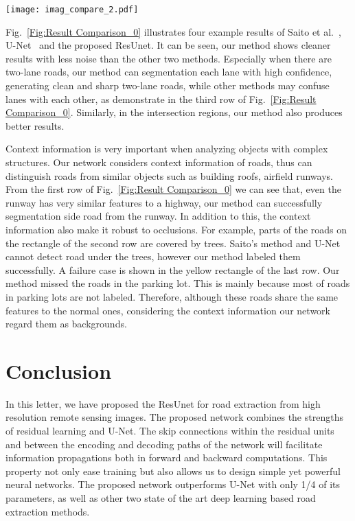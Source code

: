 \documentclass[journal]{IEEEtran}
\begin{document}
\begin{figure*}[ht]
\begin{center}
		\texttt{[image: imag\_compare\_2.pdf]}
	    \caption{Example results on the test set of Massachusetts roads dataset. (a) Input image; (b) Ground truth; (c) Saito et al.~\cite{Saito2016Multiple}; (d) U-Net~\cite{U-NET2015}; (e) The proposed ResUnet. Zoom in to see more details.}
	    \label{Fig:Result Comparison_0}
\end{center}
\vspace{-0.6cm}
\end{figure*}

Fig.~\ref{Fig:Result Comparison_0} illustrates four example results of Saito et al.~\cite{Saito2016Multiple}, U-Net~\cite{U-NET2015} and the proposed ResUnet. It can be seen, our method shows cleaner results with less noise than the other two methods. Especially when there are two-lane roads, our method can segmentation each lane with high confidence, generating clean and sharp two-lane roads, while other methods may confuse lanes with each other, as demonstrate in the third row of Fig.~\ref{Fig:Result Comparison_0}. Similarly, in the intersection regions, our method also produces better results.

Context information is very important when analyzing objects with complex structures. Our network considers context information of roads, thus can distinguish roads from similar objects such as building roofs, airfield runways. From the first row of Fig.~\ref{Fig:Result Comparison_0} we can see that, even the runway has very similar features to a highway, our method can successfully segmentation side road from the runway. In addition to this, the context information also make it robust to occlusions. For example, parts of the roads on the rectangle of the second row are covered by trees. Saito's method and U-Net cannot detect road under the trees, however our method labeled them successfully. A failure case is shown in the yellow rectangle of the last row. Our method missed the roads in the parking lot. This is mainly because most of roads in parking lots are not labeled. Therefore, although these roads share the same features to the normal ones, considering the context information our network regard them as backgrounds. 


\section{Conclusion}
\label{sec:conslusion}
In this letter, we have proposed the ResUnet for road extraction from high resolution remote sensing images. The proposed network combines the strengths of residual learning and U-Net. The skip connections within the residual units and between the encoding and decoding paths of the network will facilitate information propagations both in forward and backward computations. This property not only ease training but also allows us to design simple yet powerful neural networks. The proposed network outperforms U-Net with only 1/4 of its parameters, as well as other two state of the art deep learning based road extraction methods.





\ifCLASSOPTIONcaptionsoff
  \newpage
\fi



\end{document}
